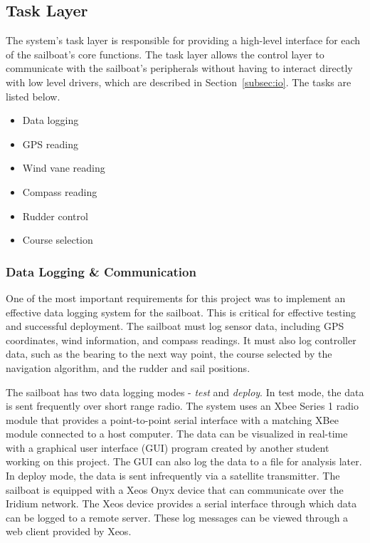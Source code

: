 \documentclass[12pt]{article}
\begin{document}
\subsection{Task Layer}
The system's task layer is responsible for providing a high-level interface for each of the sailboat's core functions. The task layer allows the control layer to communicate with the sailboat's peripherals without having to interact directly with low level drivers, which are described in Section~\ref{subsec:io}. The tasks are listed below.

\begin{itemize}
	\setlength\itemsep{0.15em}
	\item Data logging
	\item GPS reading
	\item Wind vane reading
	\item Compass reading
	\item Rudder control
	\item Course selection
\end{itemize}

\subsubsection{Data Logging \& Communication}
\label{subsubsec:comm}
One of the most important requirements for this project was to implement an effective data logging system for the sailboat. This is critical for effective testing and successful deployment. The sailboat must log sensor data, including GPS coordinates, wind information, and compass readings. It must also log controller data, such as the bearing to the next way point, the course selected by the navigation algorithm, and the rudder and sail positions. 

The sailboat has two data logging modes - \textit{test} and \textit{deploy}. In test mode, the data is sent frequently over short range radio. The system uses an Xbee Series 1 radio module that provides a point-to-point serial interface with a matching XBee module connected to a host computer. The data can be visualized in real-time with a graphical user interface (GUI) program created by another student working on this project. The GUI can also log the data to a file for analysis later. In deploy mode, the data is sent infrequently via a satellite transmitter. The sailboat is equipped with a Xeos Onyx device that can communicate over the Iridium network. The Xeos device provides a serial interface through which data can be logged to a remote server. These log messages can be viewed through a web client provided by Xeos. 
\end{document}
